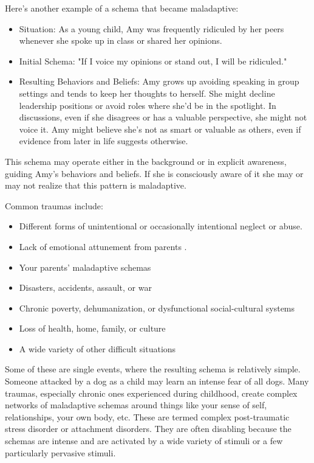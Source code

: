 \documentclass[12pt,letterpaper]{book}
\begin{document}
Here's another example of a schema that became maladaptive:
\begin{itemize}
    \item Situation: As a young child, Amy was frequently ridiculed by her peers whenever she spoke up in class or shared her opinions.
    \item Initial Schema: "If I voice my opinions or stand out, I will be ridiculed."
    \item Resulting Behaviors and Beliefs: Amy grows up avoiding speaking in group settings and tends to keep her thoughts to herself. She might decline leadership positions or avoid roles where she'd be in the spotlight. In discussions, even if she disagrees or has a valuable perspective, she might not voice it. Amy might believe she's not as smart or valuable as others, even if evidence from later in life suggests otherwise.
\end{itemize}
This schema may operate either in the background or in explicit awareness, guiding Amy's behaviors and beliefs. If she is consciously aware of it she may or may not realize that this pattern is maladaptive.

Common traumas include:
\begin{itemize}
    \item Different forms of unintentional or occasionally intentional neglect or abuse.
    \item Lack of emotional attunement from parents \cite{brownAttachmentDisturbances}.
    \item Your parents' maladaptive schemas
    \item Disasters, accidents, assault, or war
    \item Chronic poverty, dehumanization, or dysfunctional social-cultural systems \cite{roncaStructuralViolence}
    \item Loss of health, home, family, or culture
    \item A wide variety of other difficult situations
\end{itemize}
Some of these are single events, where the resulting schema is relatively simple. Someone attacked by a dog as a child may learn an intense fear of all dogs. Many traumas, especially chronic ones experienced during childhood, create complex networks of maladaptive schemas around things like your sense of self, relationships, your own body, etc. These are termed complex post-traumatic stress disorder or attachment disorders. They are often disabling because the schemas are intense and are activated by a wide variety of stimuli or a few particularly pervasive stimuli.
\end{document}
